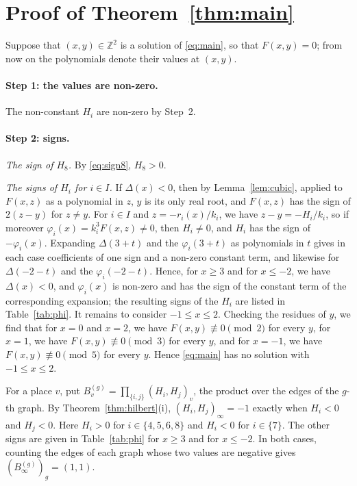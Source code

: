 \documentclass[11pt]{article}
\newcommand{\Z}{\mathbb{Z}}
\begin{document}
\section{Proof of Theorem~\ref{thm:main}}

Suppose that $(x,y)\in\Z^2$ is a solution of \eqref{eq:main}, so that $F(x,y)=0$; from now on the polynomials denote their values at $(x,y)$.
\paragraph{Step 1: the values are non-zero.} The non-constant $H_i$ are non-zero by Step~2.

\paragraph{Step 2: signs.} \emph{The sign of $H_{8}$.} By \eqref{eq:sign8}, $H_{8}>0$.

\emph{The signs of $H_i$ for $i\in I$.} If $\Delta(x)<0$, then by Lemma~\ref{lem:cubic}, applied to $F(x,z)$ as a polynomial in $z$, $y$ is its only real root, and $F(x,z)$ has the sign of $2(z-y)$ for $z\neq y$. For $i\in I$ and $z=-r_i(x)/k_i$, we have $z-y=-H_i/k_i$, so if moreover $\varphi_i(x)=k_i^3F(x,z)\neq0$, then $H_i\neq0$, and $H_i$ has the sign of $-\varphi_i(x)$. Expanding $\Delta(3+t)$ and the $\varphi_i(3+t)$ as polynomials in $t$ gives in each case coefficients of one sign and a non-zero constant term, and likewise for $\Delta(-2-t)$ and the $\varphi_i(-2-t)$. Hence, for $x\geq3$ and for $x\leq-2$, we have $\Delta(x)<0$, and $\varphi_i(x)$ is non-zero and has the sign of the constant term of the corresponding expansion; the resulting signs of the $H_i$ are listed in Table~\ref{tab:phi}. It remains to consider $-1\leq x\leq2$. Checking the residues of $y$, we find that for $x=0$ and $x=2$, we have $F(x,y)\not\equiv0\pmod{2}$ for every $y$, for $x=1$, we have $F(x,y)\not\equiv0\pmod{3}$ for every $y$, and for $x=-1$, we have $F(x,y)\not\equiv0\pmod{5}$ for every $y$. Hence \eqref{eq:main} has no solution with $-1\leq x\leq2$.

For a place $v$, put $B^{(g)}_v=\prod_{\{i,j\}}(H_i,H_j)_v$, the product over the edges of the $g$-th graph. By Theorem~\ref{thm:hilbert}(i), $(H_i,H_j)_\infty=-1$ exactly when $H_i<0$ and $H_j<0$. Here $H_i>0$ for $i\in\{4,\allowbreak 5,\allowbreak 6,\allowbreak 8\}$ and $H_i<0$ for $i\in\{7\}$. The other signs are given in Table~\ref{tab:phi} for $x\geq3$ and for $x\leq-2$. In both cases, counting the edges of each graph whose two values are negative gives $(B^{(g)}_\infty)_g=(1,1)$.
\end{document}

